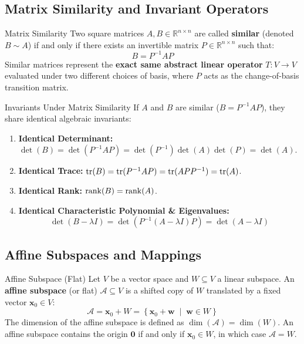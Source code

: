 \subsection{Matrix Similarity and Invariant Operators}

\begin{definitionbox}{Matrix Similarity}
Two square matrices $A, B \in \mathbb{R}^{n \times n}$ are called \textbf{similar} (denoted $B \sim A$) if and only if there exists an invertible matrix $P \in \mathbb{R}^{n \times n}$ such that:
\begin{equation}
B = P^{-1} A P
\end{equation}
Similar matrices represent the \textbf{exact same abstract linear operator} $T: V \to V$ evaluated under two different choices of basis, where $P$ acts as the change-of-basis transition matrix.
\end{definitionbox}

\begin{theorembox}{Invariants Under Matrix Similarity}
If $A$ and $B$ are similar ($B = P^{-1} A P$), they share identical algebraic invariants:
\begin{enumerate}
    \item \textbf{Identical Determinant:} $\det(B) = \det(P^{-1} A P) = \det(P^{-1})\det(A)\det(P) = \det(A)$.
    \item \textbf{Identical Trace:} $\operatorname{tr}(B) = \operatorname{tr}(P^{-1} A P) = \operatorname{tr}(A P P^{-1}) = \operatorname{tr}(A)$.
    \item \textbf{Identical Rank:} $\operatorname{rank}(B) = \operatorname{rank}(A)$.
    \item \textbf{Identical Characteristic Polynomial \& Eigenvalues:}
    \begin{equation*}
    \det(B - \lambda I) = \det(P^{-1}(A - \lambda I)P) = \det(A - \lambda I)
    \end{equation*}
\end{enumerate}
\end{theorembox}

\subsection{Affine Subspaces and Mappings}

\begin{definitionbox}{Affine Subspace (Flat)}
Let $V$ be a vector space and $W \subseteq V$ a linear subspace. An \textbf{affine subspace} (or flat) $\mathcal{A} \subseteq V$ is a shifted copy of $W$ translated by a fixed vector $\mathbf{x}_0 \in V$:
\begin{equation}
\mathcal{A} = \mathbf{x}_0 + W = \left\{ \mathbf{x}_0 + \mathbf{w} \;\middle|\; \mathbf{w} \in W \right\}
\end{equation}
The dimension of the affine subspace is defined as $\dim(\mathcal{A}) = \dim(W)$.
An affine subspace contains the origin $\mathbf{0}$ if and only if $\mathbf{x}_0 \in W$, in which case $\mathcal{A} = W$.
\end{definitionbox}

